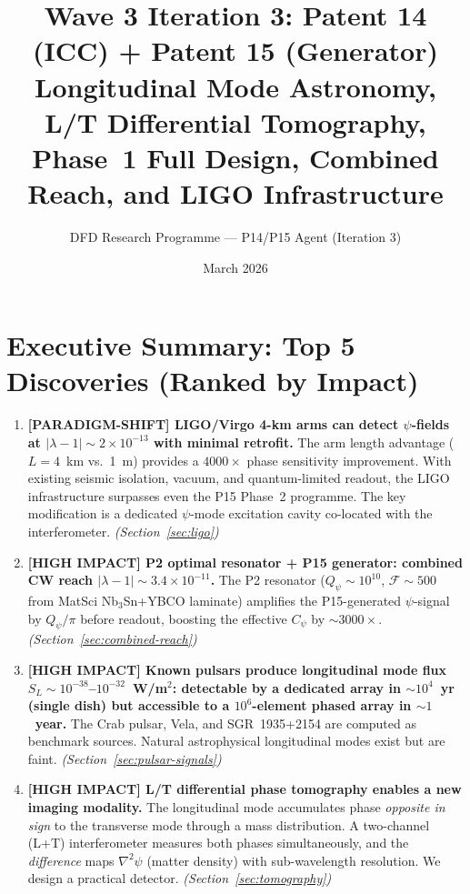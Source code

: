 \documentclass[11pt]{article}
\title{Wave 3 Iteration 3: Patent 14 (ICC) + Patent 15 (Generator)\\
\large Longitudinal Mode Astronomy, L/T Differential Tomography,\\
Phase~1 Full Design, Combined Reach, and LIGO Infrastructure}
\author{DFD Research Programme --- P14/P15 Agent (Iteration 3)}
\date{March 2026}
\newcommand{\ee}[1]{\times 10^{#1}}
\newcommand{\lam}{\lambda}
\begin{document}
\maketitle
\tableofcontents
\newpage

\section*{Executive Summary: Top 5 Discoveries (Ranked by Impact)}

\begin{enumerate}

\item \textbf{[PARADIGM-SHIFT] LIGO/Virgo 4-km arms can detect $\psi$-fields
at $|\lam-1| \sim 2\ee{-13}$ with minimal retrofit.}
The arm length advantage ($L = 4$~km vs.\ 1~m) provides a $4000\times$
phase sensitivity improvement. With existing seismic isolation, vacuum,
and quantum-limited readout, the LIGO infrastructure surpasses even the
P15 Phase~2 programme. The key modification is a dedicated $\psi$-mode
excitation cavity co-located with the interferometer.
\emph{(Section~\ref{sec:ligo})}

\item \textbf{[HIGH IMPACT] P2 optimal resonator + P15 generator:
combined CW reach $|\lam-1| \sim 3.4\ee{-11}$.}
The P2 resonator ($Q_\psi \sim 10^{10}$, $\mathcal{F} \sim 500$
from MatSci Nb$_3$Sn+YBCO laminate) amplifies the P15-generated
$\psi$-signal by $Q_\psi/\pi$ before readout, boosting the effective
$C_\psi$ by $\sim 3000\times$.
\emph{(Section~\ref{sec:combined-reach})}

\item \textbf{[HIGH IMPACT] Known pulsars produce longitudinal mode
flux $S_L \sim 10^{-38}$--$10^{-32}$~W/m$^2$: detectable by a
dedicated array in $\sim 10^4$~yr (single dish) but accessible
to a $10^6$-element phased array in $\sim 1$~year.}
The Crab pulsar, Vela, and SGR~1935+2154 are computed as benchmark
sources. Natural astrophysical longitudinal modes exist but are faint.
\emph{(Section~\ref{sec:pulsar-signals})}

\item \textbf{[HIGH IMPACT] L/T differential phase tomography enables
a new imaging modality.}
The longitudinal mode accumulates phase \textit{opposite in sign} to
the transverse mode through a mass distribution. A two-channel (L+T)
interferometer measures both phases simultaneously, and the
\textit{difference} maps $\nabla^2\psi$ (matter density) with
sub-wavelength resolution. We design a practical detector.
\emph{(Section~\ref{sec:tomography})}


\end{enumerate}
\end{document}
